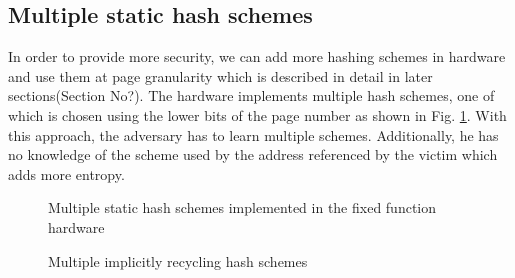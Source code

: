 \subsection{Multiple static hash schemes}
In order to provide more security, we can add more hashing schemes in hardware and use them at page granularity which is described in detail in later sections(Section No?). The hardware implements multiple hash schemes, one of which is chosen using the lower bits of the page number as shown in Fig. \ref{figure:multiple_schemes}. With this approach, the adversary has to learn multiple schemes. Additionally, he has no knowledge of the scheme used by the address referenced by the victim which adds more entropy.

\begin{figure}
  \caption{Multiple static hash schemes implemented in the fixed function hardware}
  \label{figure:multiple_schemes}
\end{figure}

\begin{figure}
  \caption{Multiple implicitly recycling hash schemes}
  \label{figure:changing_schemes}
\end{figure}

